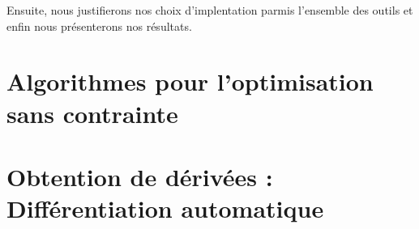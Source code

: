 \documentclass[hypertexte]{scienceUdeS}
\begin{document}
Ensuite, nous justifierons nos choix d'implentation parmis l'ensemble des outils  et enfin nous 
présenterons nos résultats.







% 



\chapter[Algorithmes pour l'optimisation sans contrainte] 
        {\singlespacing%
         Algorithmes pour l'optimisation sans contrainte}
         \label{ch:chapitre-1}

\chapter[Obtention de dérivées : Différentiation automatique] 
        {\singlespacing%
         Obtention de dérivées : Différentiation automatique}
         \label{ch:chapitre-2}
\end{document}
